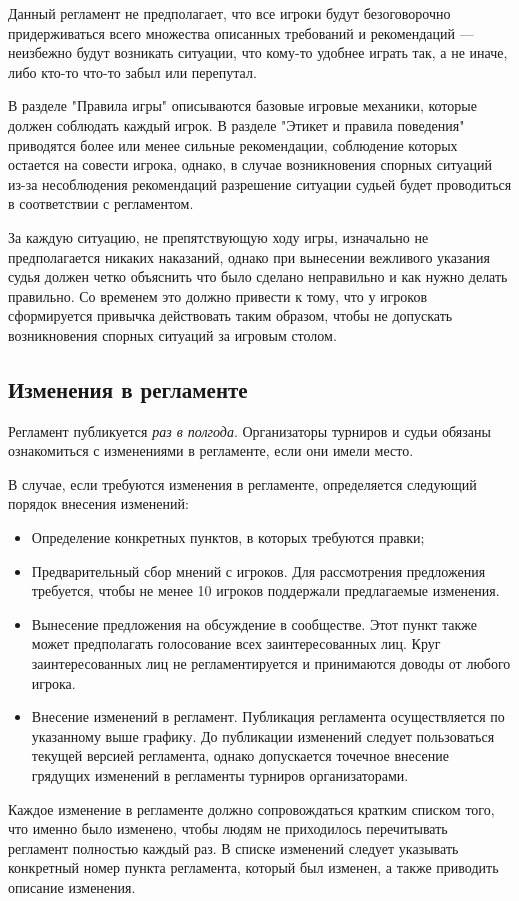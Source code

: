 Данный регламент не предполагает, что все игроки будут безоговорочно придерживаться всего множества описанных требований и рекомендаций --- неизбежно будут возникать ситуации, что кому-то удобнее играть так, а не иначе, либо кто-то что-то забыл или перепутал.

В разделе "Правила игры" описываются базовые игровые механики, которые должен соблюдать каждый игрок. В разделе "Этикет и правила поведения" приводятся более или менее сильные рекомендации, соблюдение которых остается на совести игрока, однако, в случае возникновения спорных ситуаций из-за несоблюдения рекомендаций разрешение ситуации судьей будет проводиться в соответствии с регламентом.

За каждую ситуацию, не препятствующую ходу игры, изначально не предполагается никаких наказаний, однако при вынесении вежливого указания судья должен четко объяснить что было сделано неправильно и как нужно делать правильно. Со временем это должно привести к тому, что у игроков сформируется привычка действовать таким образом, чтобы не допускать возникновения спорных ситуаций за игровым столом.

\subsection{Изменения в регламенте}

Регламент публикуется \textit{раз в полгода}. Организаторы турниров и судьи обязаны ознакомиться с изменениями в регламенте, если они имели место.

В случае, если требуются изменения в регламенте, определяется следующий порядок внесения изменений:
\begin{itemize}
	\item Определение конкретных пунктов, в которых требуются правки;
	\item Предварительный сбор мнений с игроков. Для рассмотрения предложения требуется, чтобы не менее 10 игроков поддержали предлагаемые изменения.
	\item Вынесение предложения на обсуждение в сообществе. Этот пункт также может предполагать голосование всех заинтересованных лиц. Круг заинтересованных лиц не регламентируется и принимаются доводы от любого игрока.
	\item Внесение изменений в регламент. Публикация регламента осуществляется по указанному выше графику. До публикации изменений следует пользоваться текущей версией регламента, однако допускается точечное внесение грядущих изменений в регламенты турниров организаторами.
\end{itemize}

Каждое изменение в регламенте должно сопровождаться кратким списком того, что именно было изменено, чтобы людям не приходилось перечитывать регламент полностью каждый раз. В списке изменений следует указывать конкретный номер пункта регламента, который был изменен, а также приводить описание изменения.
